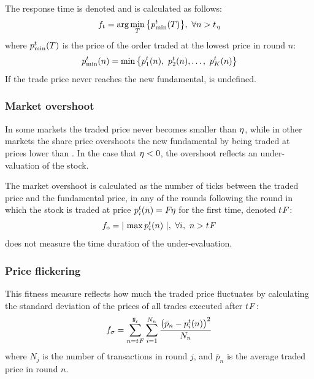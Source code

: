 The response time is denoted \timetoreachnewfundamental{} and is calculated as follows:
\begin{equation}\label{eq:timetoreachnewfundamental}
\timetoreachnewfundamental = \arg\min_T \big\{ \tradeprice{T}{\min}\big\},\ \forall n > \fundamentalshocktime
\end{equation}
where $\tradeprice{T}{\min}$ is the price of the order traded at the lowest price in round $n$:
\begin{equation}
\tradeprice{n}{\min} = \min \big\{\tradeprice{n}{1},\ \tradeprice{n}{2}, \hdots,\ \tradeprice{n}{K}\big\}
\end{equation}
If the trade price never reaches the new fundamental, \timetoreachnewfundamental is undefined.


\subsubsection{Market overshoot}
In some markets the traded price never becomes smaller than $\fundamentalaftershock$, while in other markets the share price overshoots the new fundamental by being traded at prices lower than \fundamentalaftershock. In the case that $\fundamentalshocksize < 0$, the overshoot reflects an under-valuation of the stock.

The market overshoot is calculated as the number of ticks between the traded price and the fundamental price, in any of the rounds following the round in which the stock is traded at price $\tradeprice{n}{i} = \fundamentalprice{\eta}$ for the first time, denoted $\round{F}$: 
\begin{equation}\label{eq:overshoot}
\overshoot = \lvert\ \max \tradeprice{n}{i}\ \rvert, \ \forall i,\ n > \round{F}
\end{equation}
\overshoot{} does not measure the time duration of the under-evaluation. 

\subsubsection{Price flickering}
This fitness measure reflects how much the traded price fluctuates by calculating the standard deviation of the prices of all trades executed after $\round{F}$:
\begin{equation}\label{eq:stdev}
\stdev = \sum\limits_{n = \round{F}}^{\nrounds}  \sum\limits_{i=1}^{N_n} \frac{\big(\bar{p}_n - \tradeprice{n}{i}\big)^2}{N_n}
\end{equation}
where $N_j$ is the number of transactions in round $j$, and $\bar{p}_n$ is the average traded price in round $n$.



